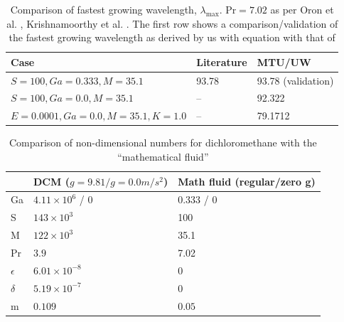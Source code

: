 \documentclass[a4paper,12pt]{article}
\begin{document}
\begin{table}[ht]
\label{tab1}
\centering
\begin{tabular}{|p{4cm}|p{3cm}|p{3cm}|}
\hline
Case & Literature \citep{Oron2000b,Krishnamoorthy1995a} & MTU/UW\\
\hline
$S=100, Ga=0.333, M=35.1$ & 93.78 & 93.78 (validation)\\
$S=100, Ga=0.0, M=35.1$ & -- & 92.322\\
$E=0.0001, Ga=0.0, M=35.1, K=1.0$ & -- & 79.1712 \\
\hline
\end{tabular}
\caption{Comparison of fastest growing wavelength, $\lambda_\text{max}$. $\text{Pr}=7.02$ as per Oron et al. \citep{Oron2000b}, Krishnamoorthy et al. \citep{Krishnamoorthy1995a}. The first row shows a comparison/validation of the fastest growing wavelength as derived by us with equation with that of \citet{Oron2000b}}
\end{table}

\begin{center}
\end{center}
\begin{table}[h]
\centering
\begin{tabular}{|l|l|l|}
\hline
 & DCM ($g=9.81 / g=0.0 m/s^2$)  & Math fluid (regular/zero g)\\
\hline

Ga & $4.11 \times 10^6$ / 0 & 0.333 / 0\\
% 
S & $143 \times 10^3$  & 100\\
% 
M & $122 \times 10^3$  & 35.1\\
% 
Pr & $3.9$ &  7.02\\
% 
$\epsilon$ & $6.01 \times 10^{-8}$ & 0\\
% 
$\delta$ & $5.19 \times 10^{-7}$  & 0 \\
% 
m & $0.109$ & $0.05$ \\
\hline
\end{tabular}
\caption{Comparison of non-dimensional numbers for dichloromethane with the ``mathematical fluid''}
\label{dcm_math_comparison}
\end{table}






\vfill
\end{document}

